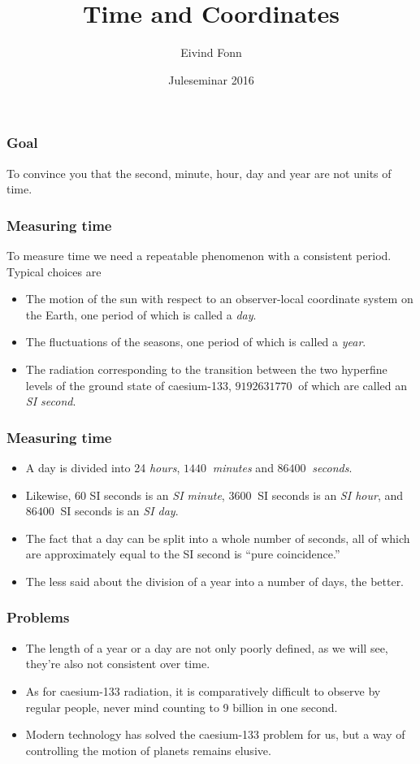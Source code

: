 \documentclass{beamer}
\title{Time and Coordinates}
\author{Eivind Fonn}
\date{Juleseminar 2016}
\begin{document}
\frame{\titlepage}

\begin{frame}
  \frametitle{Goal}

  \begin{center}
    To convince you that the second, minute, hour, day and year are not units of
    time.
  \end{center}
\end{frame}

\begin{frame}
  \frametitle{Measuring time}

  To measure time we need a repeatable phenomenon with a consistent period.
  Typical choices are

  \begin{itemize}
  \item The motion of the sun with respect to an observer-local coordinate
    system on the Earth, one period of which is called a \emph{day}.
  \item The fluctuations of the seasons, one period of which is called a
    \emph{year}.
  \item The radiation corresponding to the transition between the two hyperfine
    levels of the ground state of caesium-133, $\SI{9192631770}{}$ of which are
    called an \emph{SI second}.
  \end{itemize}
\end{frame}

\begin{frame}
  \frametitle{Measuring time}

  \begin{itemize}
  \item A day is divided into 24 \emph{hours}, $\SI{1440}{}$ \emph{minutes} and
    $\SI{86400}{}$ \emph{seconds}.
  \item Likewise, 60 SI seconds is an \emph{SI minute}, $\SI{3600}{}$ SI seconds
    is an \emph{SI hour}, and $\SI{86400}{}$ SI seconds is an \emph{SI day}.
  \item The fact that a day can be split into a whole number of seconds, all of
    which are approximately equal to the SI second is ``pure coincidence.''
  \item The less said about the division of a year into a number of days, the
    better.
  \end{itemize}
\end{frame}

\begin{frame}
  \frametitle{Problems}

  \begin{itemize}
  \item The length of a year or a day are not only poorly defined, as we will
    see, they're also not consistent over time.
  \item As for caesium-133 radiation, it is comparatively difficult to observe
    by regular people, never mind counting to 9 billion in one second.
  \item Modern technology has solved the caesium-133 problem for us, but
    a way of controlling the motion of planets remains elusive.
  \end{itemize}
\end{frame}
\end{document}
